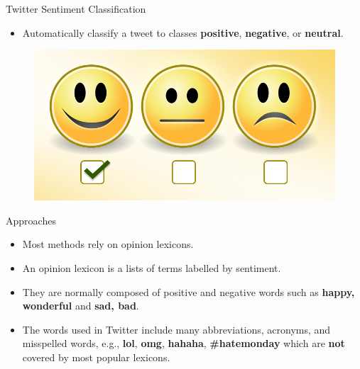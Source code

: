 \documentclass[handout]{beamer}
\begin{document}
\begin{frame}{Twitter Sentiment Classification}
\begin{scriptsize}\begin{itemize}
 \item Automatically classify a tweet to classes \textcolor[rgb]{0.00,0.00,1.00}{\textbf{positive}}, \textcolor[rgb]{1.00,0.00,0.00}{\textbf{negative}}, or \textcolor[rgb]{0.00,1.00,0.00}{\textbf{neutral}}. 
  
\end{itemize}

  \begin{figure}[h]
        	\includegraphics[scale = 0.15]{pics/sent.png}
        \end{figure}


\begin{block}{Approaches}
\begin{itemize}
\item Most methods rely on opinion lexicons.
\item An opinion lexicon is a lists of terms labelled by sentiment.
\item They are normally composed of positive and negative words such as \textcolor[rgb]{0.00,0.00,1.00}{\textbf{happy, wonderful}} and \textcolor[rgb]{1.00,0.00,0.00}{\textbf{sad, bad}}.
\item The words used in Twitter include many abbreviations, acronyms, and misspelled words, e.g., \textbf{lol}, \textbf{omg}, \textbf{hahaha}, \textbf{\#hatemonday} which are \textbf{not} covered by most popular lexicons.
\end{itemize}

\end{block}

\end{scriptsize}

\end{frame}
\end{document}
